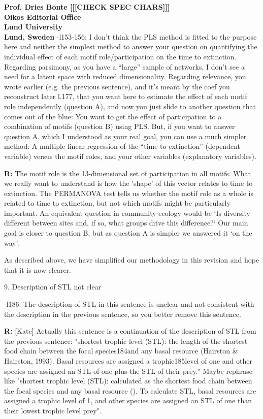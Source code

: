 \documentclass[12pt]{letter}
\begin{document}
\begin{letter}{\bf Prof. Dries Bonte [[[CHECK SPEC CHARS]]]\\
Oikos Editorial Office \\
Lund University \\
Lund, Sweden}
      -l153-156:  I don’t think the PLS method is fitted to the purpose here and neither the simplest method to answer your question on quantifying the individual effect of each motif role/participation on the time to extinction. Regarding parsimony, as you have a “large” sample of networks, I don’t see a need for a latent space with reduced dimensionality. Regarding relevance, you wrote earlier (e.g. the previous sentence), and it’s meant by the coef you reconstruct later l.177, that you want here to estimate the effect of each motif role independently (question A), and now you just slide to another question that comes out of the blue: You want to get the effect of participation to a combination of motifs (question B) using PLS. But, if you want to answer question A, which I understood as your real goal, you can use a much simpler method: A multiple linear regression of the “time to extinction” (dependent variable) versus the motif roles, and your other variables (explanatory variables).

      \textbf{R:}
      The motif role is the 13-dimensional set of participation in all motifs. What we really want to understand is how the 'shape' of this vector relates to time to extinction. The PERMANOVA test tells us whether the motif role as a whole is related to time to extinction, but not which motifs might be particularly important. An equivalent question in community ecology would be `Is diversity different between sites and, if so, what groups drive this difference?` Our main goal is closer to question B, but as question A is simpler we answered it `on the way'.


    As described above, we have simplified our methodology in this revision and hope that it is now clearer.
    

    9. Description of STL not clear

      -l186: The description of STL in this sentence is unclear and not consistent with the description in the previous sentence, so you better remove this sentence.

      \textbf{R:} [Kate]
      Actually this sentence is a continuation of the description of STL from the previous sentence: "shortest trophic level (STL): the length of the shortest food chain between the focal species184and any basal resource (Hairston & Hairston, 1993). Basal resources are assigned a trophic185level of one and other species are assigned an STL of one plus the STL of their prey." Maybe rephrase like "shortest trophic level (STL): calculated as the shortest food chain between the focal species and any basal resource (). To calculate STL, basal resources are assigned a trophic level of 1, and other species are assigned an STL of one than their lowest trophic level prey".



\end{letter}
\end{document}

